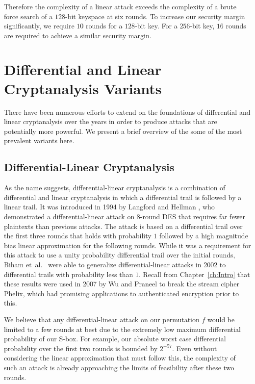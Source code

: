 Therefore the complexity of a linear attack exceeds the complexity of a brute force search of a $128$-bit keyspace at six rounds.
To increase our security margin significantly, we require $10$ rounds for a $128$-bit key.
For a $256$-bit key, $16$ rounds are required to achieve a similar security margin.

\section{Differential and Linear Cryptanalysis Variants}
There have been numerous efforts to extend on the foundations of differential and linear cryptanalysis over the years in order to produce attacks that are potentially more powerful.
We present a brief overview of the some of the most prevalent variants here.

\subsection{Differential-Linear Cryptanalysis}
As the name suggests, differential-linear cryptanalysis is a combination of differential and linear cryptanalysis in which a differential trail is followed by a linear trail.
It was introduced in 1994 by Langford and Hellman \cite{Langford1994_DifferentialLinear}, who demonstrated a differential-linear attack on 8-round DES that requires far fewer plaintexts than previous attacks.
The attack is based on a differential trail over the first three rounds that holds with probability $1$ followed by a high magnitude bias linear approximation for the following rounds.
While it was a requirement for this attack to use a unity probability differential trail over the initial rounds, Biham et~al.\ \cite{Biham2002_Enhancing} were able to generalize differential-linear attacks in 2002 to differential trails with probability less than $1$. 
Recall from Chapter~\ref{ch:Intro} that these results were used in 2007 by Wu and Praneel \cite{Wu2007_PhelixAttack} to break the stream cipher Phelix, which had promising applications to authenticated encryption prior to this.

We believe that any differential-linear attack on our permutation $f$ would be limited to a few rounds at best due to the extremely low maximum differential probability of our S-box.
For example, our absolute worst case differential probability over the first two rounds is bounded by $2^{-57}$.
Even without considering the linear approximation that must follow this, the complexity of such an attack is already approaching the limits of feasibility after these two rounds.

